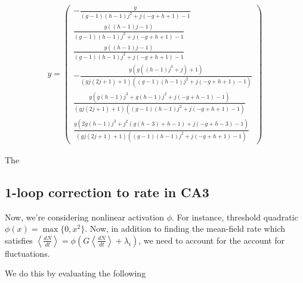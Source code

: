 \documentclass [12pt]{amsart}
\newcommand\abk[1]{\left\langle #1 \right\rangle}
\theoremstyle{definition}
\begin{document}
\begin{align*}
y = 
\begin{pmatrix}
-\frac{y}{(g-1) (h-1) j^2+j (-g+h+1)-1}\\
\frac{y ((h-1) j-1)}{(g-1) (h-1) j^2+j (-g+h+1)-1}\\
\frac{y ((h-1) j-1)}{(g-1) (h-1) j^2+j (-g+h+1)-1}\\
-\frac{y \left(g \left((h-1) j^3+j\right)+1\right)}{(g j (2 j+1)+1) \left((g-1) (h-1) j^2+j (-g+h+1)-1\right)}\\
\frac{y \left(g (h-1) j^3+g (h-1) j^2+j (-g+h-1)-1\right)}{(g j (2 j+1)+1) \left((g-1) (h-1) j^2+j (-g+h+1)-1\right)}\\
\frac{y \left(2 g (h-1) j^3+j^2 (g (h-3)+h-1)+j (-g+h-3)-1\right)}{(g j(2 j+1)+1) \left((g-1) (h-1) j^2+j(-g+h+1)-1\right)}
\end{pmatrix}
\end{align*}
  
The 

\cite{pernice2011structure}

\subsection{1-loop correction to rate in CA3}

Now, we're considering nonlinear activation $\phi$. For instance, threshold quadratic $\phi(x) = \max\{0, x^2\}$. Now, in addition to finding the mean-field rate which satisfies $\abk{\frac{dN}{dt}} = \phi(G \abk{ \frac{dN}{dt}} + \lambda_i)$, we need to account for the account for fluctuations. 

We do this by evaluating the following 
\end{document}

